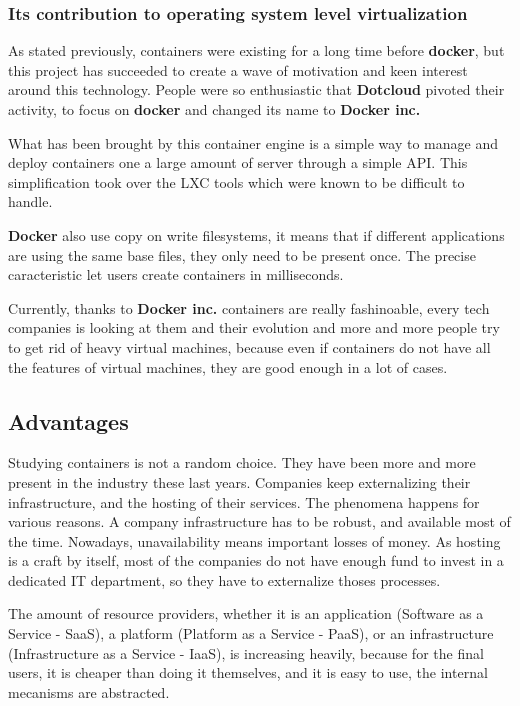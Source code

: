 \subsubsection{Its contribution to operating system level virtualization}

As stated previously, containers were existing for a long time before
\textbf{docker}, but this project has succeeded to create a wave of motivation
and keen interest around this technology. People were so enthusiastic that
\textbf{Dotcloud} pivoted their activity, to focus on \textbf{docker} and
changed its name to \textbf{Docker inc.}

What has been brought by this container engine is a simple way to manage and
deploy containers one a large amount of server through a simple API. This
simplification took over the LXC tools which were known to be difficult to
handle.

\textbf{Docker} also use copy on write filesystems, it means that if different
applications are using the same base files, they only need to be present once.
The precise caracteristic let users create containers in milliseconds.

Currently, thanks to \textbf{Docker inc.} containers are really fashinoable,
every tech companies is looking at them and their evolution and more and more
people try to get rid of heavy virtual machines, because even if containers do
not have all the features of virtual machines, they are good enough in a lot of
cases.

\subsection{Advantages}

Studying containers is not a random choice. They have been more and more
present in the industry these last years. Companies keep externalizing their
infrastructure, and the hosting of their services. The phenomena happens for
various reasons. A company infrastructure has to be robust, and available most
of the time. Nowadays, unavailability means important losses of money. As
hosting is a craft by itself, most of the companies do not have enough fund to
invest in a dedicated IT department, so they have to externalize thoses
processes.

The amount of resource providers, whether it is an application (Software as a
Service - SaaS), a platform (Platform as a Service - PaaS), or an
infrastructure (Infrastructure as a Service - IaaS), is increasing heavily,
because for the final users, it is cheaper than doing it themselves, and it is
easy to use, the internal mecanisms are abstracted.

